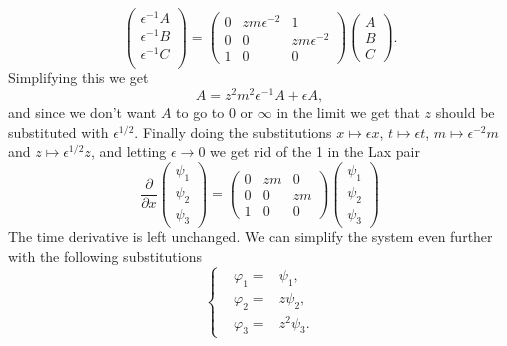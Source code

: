 \documentclass[english,master]{liumaiex}
\theoremstyle{plain}
\theoremstyle{definition}
\begin{document}
\begin{equation}
\begin{pmatrix} 
	\epsilon^{-1} A \\
	\epsilon^{-1} B \\
	\epsilon^{-1} C \\
\end{pmatrix} =
\begin{pmatrix}
	0 & zm\epsilon^{-2} & 1 \\
	0 & 0 & zm\epsilon^{-2}  \\
	1 & 0 & 0
\end{pmatrix}
\begin{pmatrix} A \\ B \\ C \end{pmatrix} .
\end{equation}
Simplifying this we get
\begin{equation}
	A = z^2m^2\epsilon^{-1}A + \epsilon A,
\end{equation}
and since we don't want $A$ to go to $0$ or $\infty$ in the limit we get that $z$ should be substituted with $\epsilon^{1/2}$.
Finally doing the substitutions $x \mapsto \epsilon x$, $t \mapsto \epsilon t$, $m \mapsto \epsilon^{-2} m$ and $z \mapsto \epsilon^{1/2}z$, and letting $\epsilon \rightarrow 0$ we get rid of the 1 in the Lax pair
\begin{equation}
\frac{\partial}{\partial x}
\begin{pmatrix} \psi_1 \\ \psi_2 \\ \psi_3 \end{pmatrix} =
\begin{pmatrix}
	0 & zm & 0 \\
	0 & 0 & zm \\
	1 & 0 & 0
\end{pmatrix}
\begin{pmatrix} \psi_1 \\ \psi_2 \\ \psi_3 \end{pmatrix}
\end{equation}
The time derivative is left unchanged. We can simplify the system even further with the following substitutions
\begin{equation}
\left\{ \begin{aligned}
	&\varphi_1 = &\psi_1, \\
	&\varphi_2 = &z\psi_2, \\
	&\varphi_3 = &z^2\psi_3.
\end{aligned} \right.
\end{equation}
\end{document}
